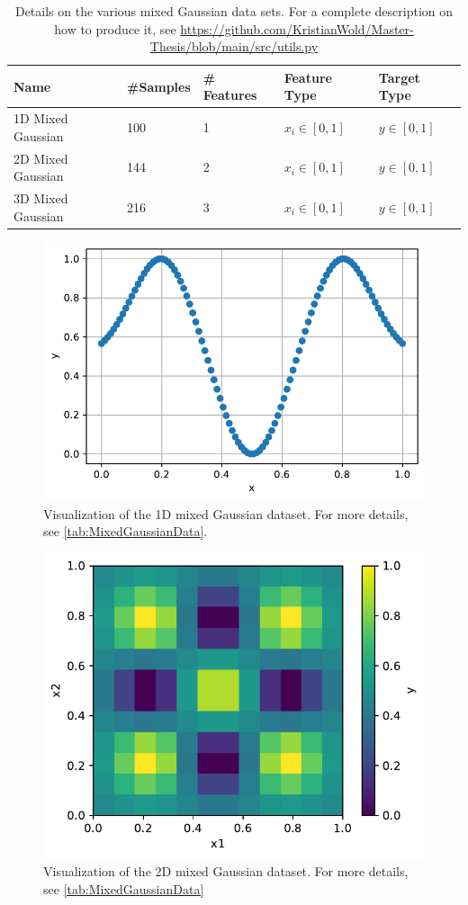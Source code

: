 \begin{table}[H]
\begin{tabular}{|l|l|l|l|l|}
\hline
 Name& \#Samples&  \# Features& Feature Type& Target Type \\ \hline
 1D Mixed Gaussian&  100&  1& $x_i \in [0,1]$ & $y \in [0,1]$  \\ \hline
 2D Mixed Gaussian&  144&  2& $x_i \in [0,1]$ & $y \in [0,1]$ \\ \hline
 3D Mixed Gaussian&  216&  3& $x_i \in [0,1]$ & $y \in [0,1]$ \\ \hline
\end{tabular}
\caption{Details on the various mixed Gaussian data sets. For a complete description on how to produce it, see \url{https://github.com/KristianWold/Master-Thesis/blob/main/src/utils.py}}
\label{tab:MixedGaussianData}
\end{table}

\begin{figure}[H]
    \centering
    \includegraphics[width=12cm]{latex/figures/gaussian_1D.pdf}
    \caption{Visualization of the 1D mixed Gaussian dataset. For more details, see \autoref{tab:MixedGaussianData}.} 
    \label{fig:mixed Gaussian 1D}
\end{figure}

\begin{figure}[H]
    \centering
    \includegraphics[width=12cm]{latex/figures/gaussian_2D.pdf}
    \caption{Visualization of the 2D mixed Gaussian dataset. For more details, see \autoref{tab:MixedGaussianData}} 
    \label{fig:mixed Gaussian 2D}
\end{figure}

